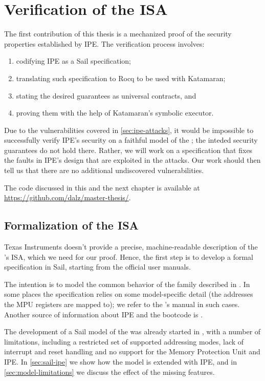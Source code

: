 \chapter{Verification of the \texorpdfstring{\msp}{MSP430} ISA}

The first contribution of this thesis is a mechanized proof of the security properties established by IPE. The verification process involves:
\begin{enumerate}
\item codifying IPE as a Sail specification;
\item translating such specification to Rocq to be used with Katamaran;
\item stating the desired guarantees as universal contracts, and
\item proving them with the help of Katamaran's symbolic executor.
\end{enumerate}

Due to the vulnerabilities covered in \cref{sec:ipe-attacks}, it would be impossible to successfully verify IPE's security on a faithful model of the \msp; the inteded security guarantees do not hold there. Rather, we will work on a specification that fixes the faults in IPE's design that are exploited in the attacks. Our work should then tell us that there are no additional undiscovered vulnerabilities.

The code discussed in this and the next chapter is available at \url{https://github.com/dalz/master-thesis/}.

\section{Formalization of the \texorpdfstring{\msp}{MSP430} ISA}

Texas Instruments doesn't provide a precise, machine-readable description of the \msp's ISA, which we need for our proof. Hence, the first step is to develop a formal specification in Sail, starting from the official user manuals.

The intention is to model the common behavior of the family described in \cite{slau367p}. In some places the specification relies on some model-specific detail (\eg the addresses the MPU registers are mapped to); we refer to the \msp[FR5969]'s manual \cite{slas704g} in such cases. Another source of information about IPE and the bootcode is \cite{slaa685}.

The development of a Sail model of the \msp was already started in \cite{mspthesis}, with a number of limitations, including a restricted set of supported addressing modes, lack of interrupt and reset handling and no support for the Memory Protection Unit and IPE. In \cref{sec:sail-ipe} we show how the model is extended with IPE, and in \cref{sec:model-limitations} we discuss the effect of the missing features.

